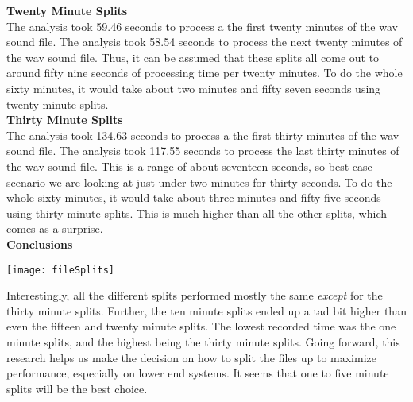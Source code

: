 \noindent\textbf{Twenty Minute Splits}\\
The analysis took 59.46 seconds to process a the first twenty minutes of the wav sound file. The analysis took 58.54 seconds to process the next twenty minutes of the wav sound file. Thus, it can be assumed that these splits all come out to around fifty nine seconds of processing time per twenty minutes. To do the whole sixty minutes, it would take about two minutes and fifty seven seconds using twenty minute splits.\\

\noindent\textbf{Thirty Minute Splits}\\
The analysis took 134.63 seconds to process a the first thirty minutes of the wav sound file. The analysis took 117.55 seconds to process the last thirty minutes of the wav sound file. This is a range of about seventeen seconds, so best case scenario we are looking at just under two minutes for thirty seconds. To do the whole sixty minutes, it would take about three minutes and fifty five seconds using thirty minute splits. This is much higher than all the other splits, which comes as a surprise.\\

\noindent\textbf{Conclusions}\\
\begin{center}
	\texttt{[image: fileSplits]}
\end{center}
Interestingly, all the different splits performed mostly the same \textit{except} for the thirty minute splits. Further, the ten minute splits ended up a tad bit higher than even the fifteen and twenty minute splits. The lowest recorded time was the one minute splits, and the highest being the thirty minute splits. Going forward, this research helps us make the decision on how to split the files up to maximize performance, especially on lower end systems. It seems that one to five minute splits will be the best choice.
